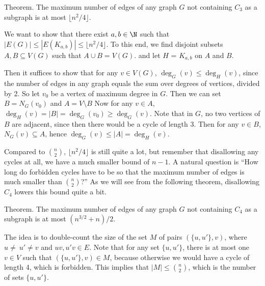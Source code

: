\proclaim Theorem. The maximum number of edges of any graph $G$ not containing $C_3$ as a subgraph is at most $\lfloor n^2/4 \rfloor$.

\proof We want to show that there exist $a,b\in \N$ such that $|E(G)|\leq |E(K_{a,b})| \leq \lfloor n^2/4 \rfloor$. To this end, we find disjoint subsets $A,B\subseteq V(G)$ such that $A\cup B = V(G)$. and let $H$ = $K_{a,b}$ on $A$ and $B$.

Then it suffices to show that for any $v\in V(G)$, $\deg_G(v) \leq \deg_H(v)$, since the number of edges in any graph equals the sum over degrees of vertices, divided by 2. So let $v_0$ be a vertex of maximum degree in $G$. Then we can set $B = N_G(v_0)$ and $A = V\setminus B$ Now for any $v\in A$, $\deg_H(v) = |B| = \deg_G(v_0) \geq \deg_G(v)$. Note that in $G$, no two vertices of $B$ are adjacent, since then there would be a cycle of length 3. Then for any $v\in B$, $N_G(v)\subseteq A$, hence $\deg_G(v)\leq |A| = \deg_H(v)$.\slug

Compared to ${n\choose 2}$, $\lfloor n^2/4 \rfloor$ is still quite a lot, but remember that disallowing any cycles at all, we have a much smaller bound of $n-1$. A natural question is ``How long do forbidden cycles have to be so that the maximum number of edges is much smaller than ${n\choose 2}$?'' As we will see from the following theorem, disallowing $C_4$ lowers this bound quite a bit.

\proclaim Theorem. The maximum number of edges of any graph $G$ not containing $C_4$ as a subgraph is at most $(n^{3/2} + n) / 2$. 

\proof The idea is to double-count the size of the set $M$ of pairs $(\{u, u'\}, v)$, where $u\neq\ u'\neq v$ and $uv, u'v\in E$. Note that for any set $\{u, u'\}$, there is at most one $v\in V$ such that $(\{u, u'\}, v)\in M$, because otherwise we would have a cycle of length 4, which is forbidden. This implies that $|M|\leq {n\choose 2}$, which is the number of sets $\{u, u'\}$.

